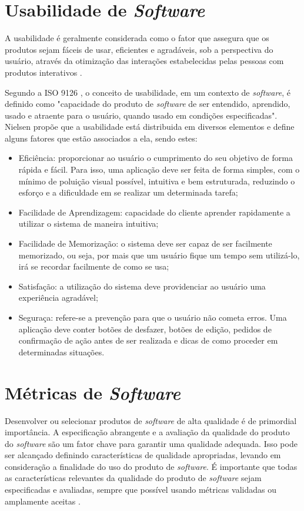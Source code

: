 \section{Usabilidade de \textit{Software}}
A usabilidade é geralmente considerada como o fator que assegura que
os produtos sejam fáceis de usar, eficientes e agradáveis, sob a
perspectiva do usuário, através da otimização das interações
estabelecidas pelas pessoas com produtos interativos \cite{rogers_2013}.

Segundo a ISO 9126 \cite{iso9126}, o conceito de usabilidade, em um contexto de \textit{software}, é definido como "capacidade do produto de \textit{software} de ser entendido, aprendido, usado e atraente para o usuário, quando usado em condições especificadas". Nielsen \cite{nielsen_1994} propõe que a usabilidade está distribuida em diversos elementos e define alguns fatores que estão associados a ela, sendo estes:

\begin{itemize}
    \item Eficiência: proporcionar ao usuário o cumprimento do seu objetivo de forma rápida e fácil. Para isso, uma aplicação deve ser feita de forma simples, com o mínimo de poluição visual possível, intuitiva e bem estruturada, reduzindo o esforço e a dificuldade em se realizar um determinada tarefa;
    \item Facilidade de Aprendizagem: capacidade do cliente aprender rapidamente a utilizar o sistema de maneira intuitiva;
    \item Facilidade de Memorização: o sistema deve ser capaz de ser facilmente memorizado, ou seja, por mais que um usuário fique um tempo sem utilizá-lo, irá se recordar facilmente de como se usa;
    \item Satisfação: a utilização do sistema deve providenciar ao usuário uma experiência agradável;
    \item Seguraça: refere-se a prevenção para que o usuário não cometa erros. Uma aplicação deve conter botões de desfazer, botões de edição, pedidos de confirmação de ação antes de ser realizada e dicas de como proceder em determinadas situações.
\end{itemize}

\section{Métricas de \textit{Software}}
Desenvolver ou selecionar produtos de \textit{software} de alta qualidade é de primordial importância. A especificação abrangente e a avaliação da qualidade do produto do \textit{software} são um fator chave para garantir uma qualidade adequada. Isso pode ser alcançado definindo características de qualidade apropriadas, levando em consideração a finalidade do uso do produto de \textit{software}. É importante que todas as características relevantes da qualidade do produto de \textit{software} sejam especificadas e avaliadas, sempre que possível usando métricas validadas ou amplamente aceitas \cite{iso9126}.

